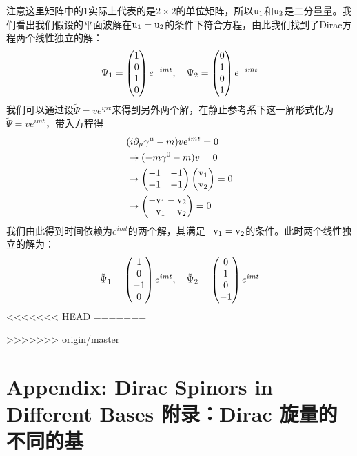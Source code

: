 注意这里矩阵中的1实际上代表的是$2 \times 2$的单位矩阵，所以$\rm u_1$和$\rm u_2$是二分量量。我们看出我们假设的平面波解在$\rm u_1 =u_2$的条件下符合方程，由此我们找到了Dirac方程两个线性独立的解：
\begin{equation}
\Psi_1=\begin{pmatrix} 1\\0\\1\\0 \end{pmatrix} e^{-imt},~~~\Psi_2=\begin{pmatrix} 0\\1\\0\\1 \end{pmatrix} e^{-imt}
\end{equation}
我们可以通过设$\tilde \Psi =ve^{ipx}$来得到另外两个解，在静止参考系下这一解形式化为$\tilde \Psi=ve^{imt}$，带入方程得
\begin{equation}
\begin{split}
&(i\partial_\mu\gamma^\mu-m)ve^{imt}=0\\
&\to (-m\gamma^0-m)v=0\\
&\to \begin{pmatrix} -1 & -1 \\ -1 & -1 \end{pmatrix} \begin{pmatrix} \rm v_1 \\ \rm v_2 \end{pmatrix} =0\\
&\to \begin{pmatrix} \rm -v_1-v_2 \\ \rm -v_1-v_2 \end{pmatrix} =0
\end{split}
\end{equation}
我们由此得到时间依赖为$e^{imt}$的两个解，其满足$\rm -v_1=v_2$的条件。此时两个线性独立的解为：
\begin{equation}
\tilde \Psi_1=\begin{pmatrix} 1\\0\\-1\\0 \end{pmatrix} e^{imt},~~~\tilde \Psi_2=\begin{pmatrix} 0\\1\\0\\-1 \end{pmatrix} e^{imt}
\end{equation}
<<<<<<< HEAD
=======


>>>>>>> origin/master
\section[附录：Dirac 旋量的不同的基]{Appendix: Dirac Spinors in Different Bases 附录：Dirac 旋量的不同的基}\label{sec8.10}

